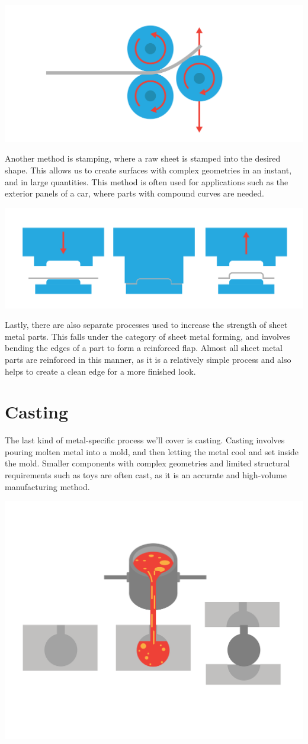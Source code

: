 \includegraphics[width=.75\textwidth]{rolling.png}


Another method is stamping, where a raw sheet is stamped into the desired shape. This allows us to create surfaces with complex geometries in an instant, and in large quantities. This method is often used for applications such as the exterior panels of a car, where parts with compound curves are needed.

\includegraphics[width=.75\textwidth]{stamping.png}



Lastly, there are also separate processes used to increase the strength of sheet metal parts. This falls under the category of sheet metal forming, and involves bending the edges of a part to form a reinforced flap. Almost all sheet metal parts are reinforced in this manner, as it is a relatively simple process and also helps to create a clean edge for a more finished look.

\section{Casting}

The last kind of metal-specific process we’ll cover is casting. Casting involves pouring molten metal into a mold, and then letting the metal cool and set inside the mold. Smaller components with complex geometries and limited structural requirements such as toys are often cast, as it is an accurate and high-volume manufacturing method.

\includegraphics[width=.75\textwidth]{casting.png}


